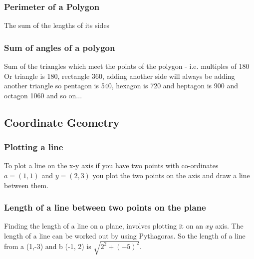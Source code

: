 \documentclass{article}
\begin{document}
\subsubsection{Perimeter of a Polygon}
The sum of the lengths of its sides
\subsubsection{Sum of angles of a polygon}
Sum of the triangles which meet the points of the polygon - i.e. multiples of 180
Or triangle is 180, rectangle 360, adding another side will always be adding another triangle so
pentagon is 540, hexagon is 720 and heptagon is 900 and octagon 1060 and so on...

\newpage
\subsection{Coordinate Geometry}
\subsubsection{Plotting a line}
To plot a line on the x-y axis if you have two points with co-ordinates $a = (1,1)$ and $y = (2,3)$ you plot the two points on the axis and draw a line between them.


\subsubsection{Length of a line between two points on the plane}
Finding the length of a line on a plane, involves plotting it on an $x y $ axis. The length of a line can be worked out by using Pythagoras. So the length of a line from a (1,-3) and b (-1, 2) is $ \sqrt{2^{2} + (-5)^{2}}$.
 
\end{document}
